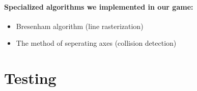 \paragraph{Specialized algorithms we implemented in our game:}
\begin{itemize}
\item Bresenham algorithm (line rasterization) \cite{graphics-algorithms}
\item The method of seperating axes (collision detection) \cite{collision-algorithms}

\end{itemize}

\section{Testing}
